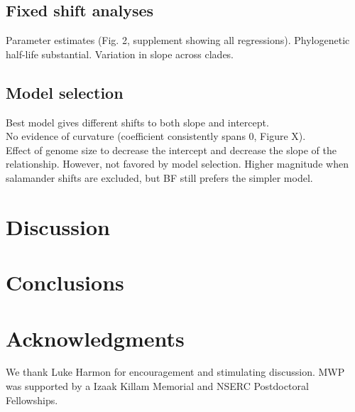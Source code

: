 \documentclass[a4paper,11pt]{article}
\begin{document}
\subsection*{Fixed shift analyses} Parameter estimates (Fig. 2, supplement showing all regressions). Phylogenetic half-life substantial. Variation in slope across clades. \\

\subsection*{Model selection} Best model gives different shifts to both slope and intercept.\\

No evidence of curvature (coefficient consistently spans 0, Figure X). \\

Effect of genome size to decrease the intercept and decrease the slope of the relationship. However, not favored by model selection. Higher magnitude when salamander shifts are excluded, but BF still prefers the simpler model. \\



\section*{Discussion}

\section*{Conclusions}

\section*{Acknowledgments}
We thank Luke Harmon for encouragement and stimulating discussion. MWP was supported by a Izaak Killam Memorial and NSERC Postdoctoral Fellowships.




\newpage
\end{document}
